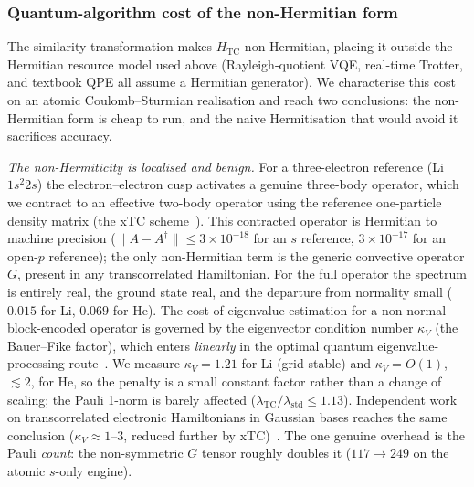 \documentclass[aps,pra,twocolumn,superscriptaddress,longbibliography]{revtex4-2}
\begin{document}
\subsubsection{Quantum-algorithm cost of the non-Hermitian form}
\label{sec:tc_nonhermitian_cost}

The similarity transformation makes $H_{\mathrm{TC}}$ non-Hermitian,
placing it outside the Hermitian resource model used above
(Rayleigh-quotient VQE, real-time Trotter, and textbook QPE all assume a
Hermitian generator).  We characterise this cost on an atomic
Coulomb--Sturmian realisation and reach two conclusions: the
non-Hermitian form is cheap to run, and the naive Hermitisation that
would avoid it sacrifices accuracy.

\emph{The non-Hermiticity is localised and benign.}  For a
three-electron reference (Li~$1s^2 2s$) the electron--electron cusp
activates a genuine three-body operator, which we contract to an
effective two-body operator using the reference one-particle density
matrix (the xTC scheme~\cite{christlmaier2023xtc}).  This contracted
operator is Hermitian to machine precision
($\lVert A - A^\dagger\rVert \le 3\times10^{-18}$ for an $s$ reference,
$3\times10^{-17}$ for an open-$p$ reference); the only non-Hermitian
term is the generic convective operator $G$, present in any
transcorrelated Hamiltonian.  For the full operator the spectrum is
entirely real, the ground state real, and the departure from normality
small ($0.015$ for Li, $0.069$ for He).  The cost of eigenvalue
estimation for a non-normal block-encoded operator is governed by the
eigenvector condition number $\kappa_V$ (the Bauer--Fike factor), which
enters \emph{linearly} in the optimal quantum eigenvalue-processing
route~\cite{lowsu2024qeve}.  We measure $\kappa_V = 1.21$ for Li
(grid-stable) and $\kappa_V = O(1)$, $\lesssim 2$, for He, so the penalty
is a small constant factor rather than a change of scaling; the Pauli
1-norm is barely affected
($\lambda_{\mathrm{TC}}/\lambda_{\mathrm{std}} \le 1.13$).  Independent
work on transcorrelated electronic Hamiltonians in Gaussian bases
reaches the same conclusion ($\kappa_V \approx 1$--$3$, reduced further
by xTC)~\cite{uvarov2025qeve_tc}.  The one genuine overhead is the Pauli
\emph{count}: the non-symmetric $G$ tensor roughly doubles it
($117 \to 249$ on the atomic $s$-only engine).
\end{document}
